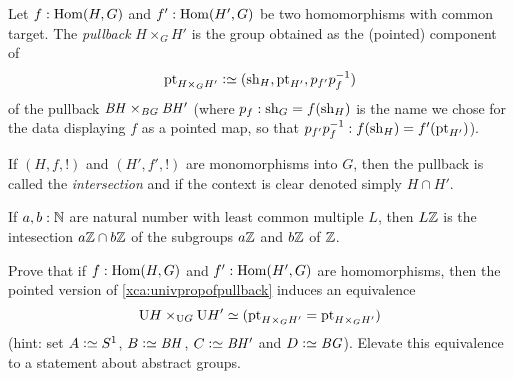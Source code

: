 \begin{definition}
  \label{def:intersectionofgroups}
  Let $f:\Hom(H,G)$ and $f':\Hom(H',G)$ be two homomorphisms with common target.  The \emph{pullback} $H\times_GH'$ is the group obtained as the (pointed) component of
$$\pt_{H\times_GH'}\defequi(\sh_H,\pt_{H'},p_{f'}p_f^{-1})$$ of the pullback $\mathit{B}\mathit{H}\times_{\mathit{B}\mathit{G}}\mathit{B}\mathit{H}'$ (where $p_f:\mathrm{sh}_G=f(\mathrm{sh}_H)$ is the name we chose for the data displaying $f$ as a pointed map, so that $p_{f'}p_f^{-1}:f(\mathrm{sh}_H)=f'(\mathrm{pt}_{H'})$).

If $(H,f,!)$ and $(H',f',!)$ are monomorphisms into $G$, then the pullback is called the \emph{intersection} and if the context is clear denoted simply $H\cap H'$.
\end{definition}
\begin{example}
  If $a,b:\mathbb{N}$ are natural number with least common multiple $L$, then $L\mathbb{Z}$ is the intesection $a\mathbb{Z}\cap b\mathbb{Z}$ of the subgroups $a\mathbb{Z}$ and $b\mathbb{Z}$ of $\mathbb{Z}$.
\end{example}

\begin{xca}
  Prove that if $f:\Hom(H,G)$ and $f':\Hom(H',G)$ are homomorphisms, then the pointed version of \cref{xca:univpropofpullback} induces an equivalence
$$\mathrm{U} H\times_{\mathrm{U} G}\mathrm{U} {H'}
\simeq (\mathrm{pt}_{H\times_GH'}=\mathrm{pt}_{H\times_GH'})
$$
(hint: set $A\defequi S^1$, $B\defequi \BH$, $C\defequi \BH'$ and $D\defequi \BG$).  Elevate this equivalence to a statement about abstract groups.
\end{xca}

